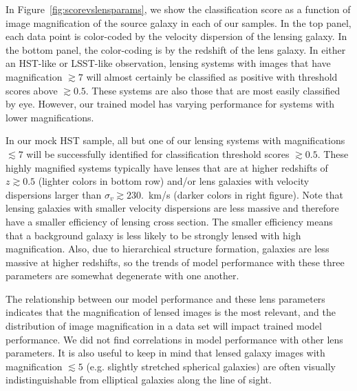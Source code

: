 \documentclass{emulateapj}
\def\gsim{\gtrsim}
\def\lsim{\lesssim}
\begin{document}
In Figure~\ref{fig:scorevslensparams}, we show the classification
score as a function of image magnification of the source galaxy in
each of our samples.  In the top panel, each data point is color-coded
by the velocity dispersion of the lensing galaxy.  In the bottom
panel, the color-coding is by the redshift of the lens galaxy.  In
either an HST-like or LSST-like observation, lensing systems with
images that have magnification $\gsim7$ will almost certainly be
classified as positive with threshold scores above $\gsim0.5$.  These
systems are also those that are most easily classified by eye.
However, our trained model has varying performance for systems with
lower magnifications.

In our mock HST sample, all but one of our lensing systems with
magnifications $\lsim7$ will be successfully identified for
classification threshold scores $\gsim0.5$.  These highly magnified
systems typically have lenses that are at higher redshifts of
$z\gsim0.5$ (lighter colors in bottom row) and/or lens galaxies with
velocity dispersions larger than $\sigma_v\gsim230.$~km/s (darker
colors in right figure).  Note that lensing galaxies with smaller
velocity dispersions are less massive and therefore have a smaller
efficiency of lensing cross section.  The smaller efficiency means
that a background galaxy is less likely to be strongly lensed with
high magnification.  Also, due to hierarchical structure formation,
galaxies are less massive at higher redshifts, so the trends of model
performance with these three parameters are somewhat degenerate with
one another.

The relationship between our model performance and these lens
parameters indicates that the magnification of lensed images is the
most relevant, and the distribution of image magnification in a data
set will impact trained model performance.  We did not find
correlations in model performance with other lens parameters.  It is
also useful to keep in mind that lensed galaxy images with
magnification $\lsim5$ (e.g. slightly stretched spherical galaxies)
are often visually indistinguishable from elliptical galaxies along
the line of sight.  
\end{document}

